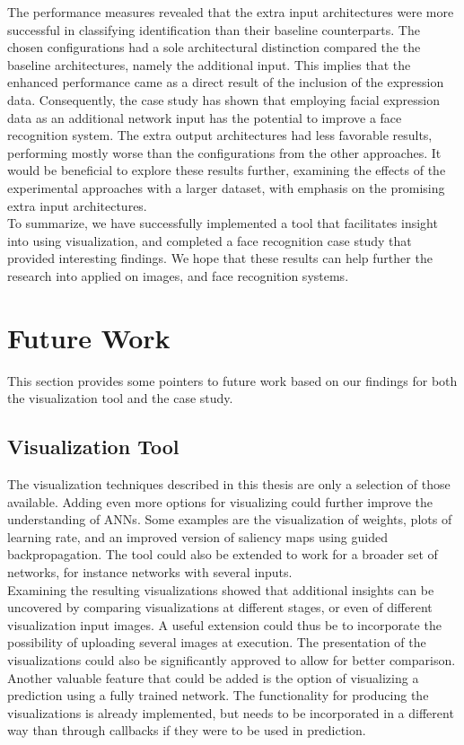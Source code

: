 \noindent The performance measures revealed that the extra input architectures were more successful in classifying identification than their baseline counterparts. The chosen configurations had a sole architectural distinction compared the the baseline architectures, namely the additional input. This implies that the enhanced performance came as a direct result of the inclusion of the expression data. Consequently, the case study has shown that employing facial expression data as an additional network input has the potential to improve a face recognition system. The extra output architectures had less favorable results, performing mostly worse than the configurations from the other approaches. It would be beneficial to explore these results further, examining the effects of the experimental approaches with a larger dataset, with emphasis on the promising extra input architectures. \\

\noindent To summarize, we have successfully implemented a tool that facilitates insight into  using visualization, and completed a face recognition case study that provided interesting findings. We hope that these results can help further the research into  applied on images, and face recognition systems.

\section{Future Work}

This section provides some pointers to future work based on our findings for both the visualization tool and the case study.

\subsection{Visualization Tool}

The visualization techniques described in this thesis are only a selection of those available. Adding even more options for visualizing could further improve the understanding of ANNs. Some examples are the visualization of weights, plots of learning rate, and an improved version of saliency maps using guided backpropagation. The tool could also be extended to work for a broader set of networks, for instance networks with several inputs. \\

\noindent Examining the resulting visualizations showed that additional insights can be uncovered by comparing visualizations at different stages, or even of different visualization input images. A useful extension could thus be to incorporate the possibility of uploading several images at execution. The presentation of the visualizations could also be significantly approved to allow for better comparison. Another valuable feature that could be added is the option of visualizing a prediction using a fully trained network. The functionality for producing the visualizations is already implemented, but needs to be incorporated in a different way than through callbacks if they were to be used in prediction.\\

